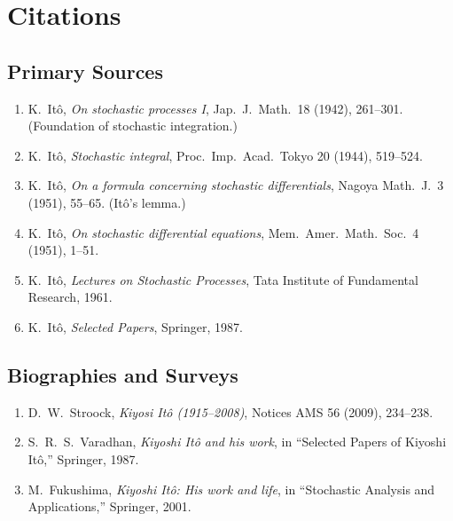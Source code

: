 \section{Citations}\subsection*{Primary Sources}
\begin{enumerate}
    \item K.\ It\^{o}, \textit{On stochastic processes I}, Jap.\ J.\ Math.\ 18 (1942), 261--301. (Foundation of stochastic integration.)
    \item K.\ It\^{o}, \textit{Stochastic integral}, Proc.\ Imp.\ Acad.\ Tokyo 20 (1944), 519--524.
    \item K.\ It\^{o}, \textit{On a formula concerning stochastic differentials}, Nagoya Math.\ J.\ 3 (1951), 55--65. (It\^{o}'s lemma.)
    \item K.\ It\^{o}, \textit{On stochastic differential equations}, Mem.\ Amer.\ Math.\ Soc.\ 4 (1951), 1--51.
    \item K.\ It\^{o}, \textit{Lectures on Stochastic Processes}, Tata Institute of Fundamental Research, 1961.
    \item K.\ It\^{o}, \textit{Selected Papers}, Springer, 1987.
\end{enumerate}

\subsection*{Biographies and Surveys}
\begin{enumerate}
    \item D.\ W.\ Stroock, \textit{Kiyosi It\^{o} (1915--2008)}, Notices AMS 56 (2009), 234--238.
    \item S.\ R.\ S.\ Varadhan, \textit{Kiyoshi It\^{o} and his work}, in ``Selected Papers of Kiyoshi It\^{o},'' Springer, 1987.
    \item M.\ Fukushima, \textit{Kiyoshi It\^{o}: His work and life}, in ``Stochastic Analysis and Applications,'' Springer, 2001.
\end{enumerate}

